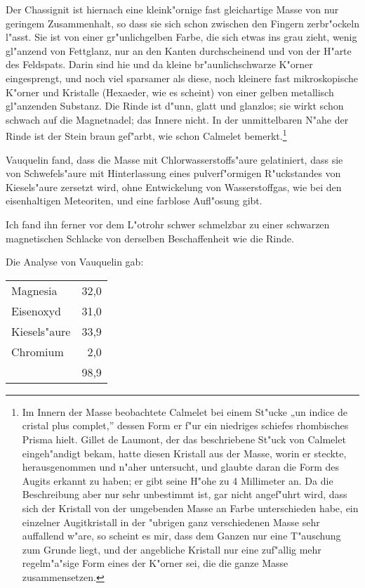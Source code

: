 \documentclass[a4paper, 11pt, oneside]{article}
\begin{document}
Der Chassignit ist hiernach eine kleink"ornige fast gleichartige Masse von nur geringem Zusammenhalt, so dass sie sich schon zwischen den Fingern zerbr"ockeln l"asst. Sie ist von einer gr"unlichgelben Farbe, die sich etwas ins grau zieht, wenig gl"anzend von Fettglanz, nur an den Kanten durchscheinend und von der H"arte des Feldspats. Darin sind hie und da kleine br"aunlichschwarze K"orner eingesprengt, und noch viel sparsamer als diese, noch kleinere fast mikroskopische K"orner und Kristalle (Hexaeder, wie es scheint) von einer gelben metallisch gl"anzenden Substanz. Die Rinde ist d"unn, glatt und glanzlos; sie wirkt schon schwach auf die Magnetnadel; das Innere nicht. In der unmittelbaren N"ahe der Rinde ist der Stein braun gef"arbt, wie schon Calmelet bemerkt.\footnote{Im Innern der Masse beobachtete Calmelet bei einem St"ucke „un indice de cristal plus complet,” dessen Form er f"ur ein niedriges schiefes rhombisches Prisma hielt. Gillet de Laumont, der das beschriebene St"uck von Calmelet eingeh"andigt bekam, hatte diesen Kristall aus der Masse, worin er steckte, herausgenommen und n"aher untersucht, und glaubte daran die Form des Augits erkannt zu haben; er gibt seine H"ohe zu 4 Millimeter an. Da die Beschreibung aber nur sehr unbestimmt ist, gar nicht angef"uhrt wird, dass sich der Kristall von der umgebenden Masse an Farbe unterschieden habe, ein einzelner Augitkristall in der "ubrigen ganz verschiedenen Masse sehr auffallend w"are, so scheint es mir, dass dem Ganzen nur eine T"auschung zum Grunde liegt, und der angebliche Kristall nur eine zuf"allig mehr regelm"a"sige Form eines der K"orner sei, die die ganze Masse zusammensetzen.}

Vauquelin fand, dass die Masse mit Chlorwasserstoffs"aure gelatiniert, dass sie von Schwefels"aure mit Hinterlassung eines pulverf"ormigen R"uckstandes von Kiesels"aure zersetzt wird, ohne Entwickelung von Wasserstoffgas, wie bei den eisenhaltigen Meteoriten, und eine farblose Aufl"osung gibt.

Ich fand ihn ferner vor dem L"otrohr schwer schmelzbar zu einer schwarzen magnetischen Schlacke von derselben Beschaffenheit wie die Rinde.

Die Analyse von Vauquelin gab:  
\begin{center}
\begin{tabular}{ l r }
    Magnesia & 32,0\\
    Eisenoxyd & 31,0\\
    Kiesels"aure & 33,9\\
    Chromium & 2,0\\
     & 98,9\\
\end{tabular}
\end{center}
\end{document}
